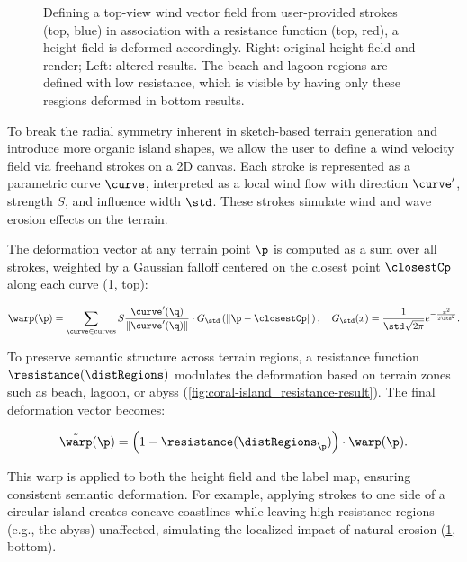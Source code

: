 \documentclass{egpubl}
\begin{document}
\begin{figure}
    \caption{Defining a top-view wind vector field from user-provided strokes (top, blue) in association with a resistance function (top, red), a height field is deformed accordingly. Right: original height field and render; Left: altered results. The beach and lagoon regions are defined with low resistance, which is visible by having only these resgions deformed in bottom results. }
    \label{fig:coral-island_wind-effect-result}
\end{figure}

To break the radial symmetry inherent in sketch-based terrain generation and introduce more organic island shapes, we allow the user to define a wind velocity field via freehand strokes on a 2D canvas. Each stroke is represented as a parametric curve $\curve$, interpreted as a local wind flow with direction $\curve'$, strength $S$, and influence width $\std$. These strokes simulate wind and wave erosion effects on the terrain.

The deformation vector at any terrain point $\p$ is computed as a sum over all strokes, weighted by a Gaussian falloff centered on the closest point $\closestCp$ along each curve (\cref{fig:coral-island_wind-effect-result}, top):

\begin{align}
    \warp(\p) = \sum_{\curve \in \text{curves}} S \frac{\curve'(\q)}{\| \curve'(\q) \| } \cdot G_\std\left(\| \p - \closestCp \| \right), \quad
    G_\std(x) = \frac{1}{\std \sqrt{2\pi}} e^{-\frac{x^2}{2 \std^2}}.
\end{align}

To preserve semantic structure across terrain regions, a resistance function $\resistance(\distRegions)$ modulates the deformation based on terrain zones such as beach, lagoon, or abyss (\cref{fig:coral-island_resistance-result}). The final deformation vector becomes:

\begin{align}
    \Tilde{\warp}(\p) = \left(1 - \resistance(\distRegions_\p) \right) \cdot \warp(\p).
\end{align}

This warp is applied to both the height field and the label map, ensuring consistent semantic deformation. For example, applying strokes to one side of a circular island creates concave coastlines while leaving high-resistance regions (e.g., the abyss) unaffected, simulating the localized impact of natural erosion (\cref{fig:coral-island_wind-effect-result}, bottom).
\end{document}
